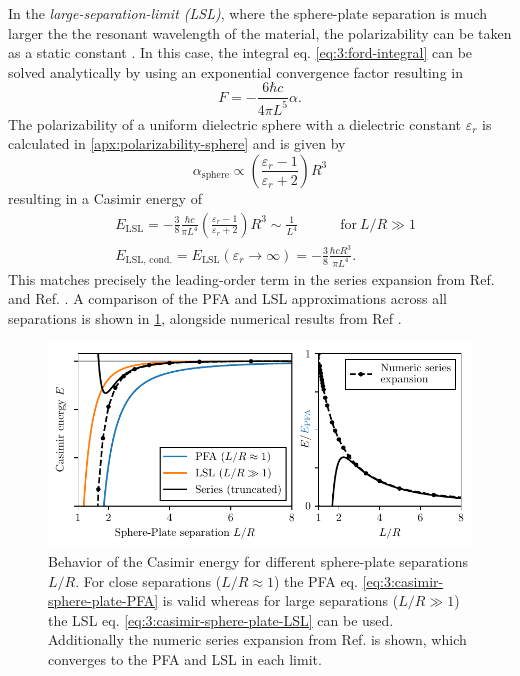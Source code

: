 In the \emph{large-separation-limit (LSL)}, where the sphere-plate separation is much larger the the resonant wavelength of the material, the polarizability can be taken as a static constant \cite{Ford_1998,Kamp_2020}.
In this case, the integral eq. \eqref{eq:3:ford-integral} can be solved analytically by using an exponential convergence factor resulting in
\begin{equation}
  F = -\frac{6 \hbar c}{4 \pi L^5} \alpha .
\end{equation}
The polarizability of a uniform dielectric sphere with a dielectric constant $\varepsilon_r$ is calculated in \cref{apx:polarizability-sphere} and is given by
\begin{equation}\label{eq:3:polarizability-sphere}
  \alpha_\mathrm{sphere} \propto \left(\frac{\varepsilon_r - 1}{\varepsilon_r + 2}\right) R^3
\end{equation}
resulting in a Casimir energy of
\begin{align}\label{eq:3:casimir-sphere-plate-LSL}
  &E_\mathrm{LSL} = -\frac{3}{8} \frac{\hbar c}{\pi L^4} \left(\frac{\varepsilon_r - 1}{\varepsilon_r + 2}\right)R^3 \sim \frac{1}{L^4} \quad\quad\quad \text{for}\ L/R \gg 1 \\ \label{eq:3:casimir-sphere-plate-LSL-conducting}
  &E_\mathrm{LSL,\,cond.} = E_\mathrm{LSL}(\varepsilon_r \rightarrow \infty) = -\frac{3}{8} \frac{\hbar c R^3}{\pi L^4} .
\end{align}
This matches precisely the leading-order term in the series expansion from Ref. \cite{Emig_2007a} and Ref. \cite{Pirozhenko_2013}.
A comparison of the PFA and LSL approximations across all separations is shown in \cref{fig:3:casimir-behavior}, alongside numerical results from Ref \cite{Emig_2007a}.
\begin{figure}[!ht]
  \centering
  \includegraphics[width=\textwidth]{./../figures/casimir/casimir-behavior.pdf}
  \caption{Behavior of the Casimir energy for different sphere-plate separations $L/R$. For close separations ($L/R \approx 1$) the PFA eq. \eqref{eq:3:casimir-sphere-plate-PFA} is valid whereas for large separations ($L/R \gg 1$) the LSL eq. \eqref{eq:3:casimir-sphere-plate-LSL} can be used. Additionally the numeric series expansion from Ref. \cite{Emig_2007a} is shown, which converges to the PFA and LSL in each limit.}
  \label{fig:3:casimir-behavior}
\end{figure}

